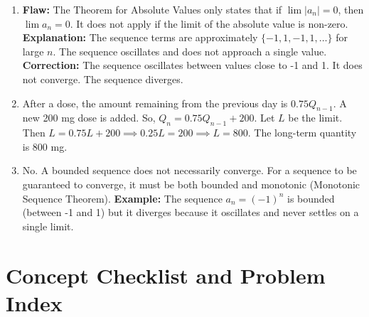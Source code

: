 \documentclass{article}
\begin{document}
\begin{enumerate}
    \item \textbf{Flaw:} The Theorem for Absolute Values only states that if $\lim |a_n| = 0$, then $\lim a_n=0$. It does not apply if the limit of the absolute value is non-zero. \textbf{Explanation:} The sequence terms are approximately $\{-1, 1, -1, 1, \dots\}$ for large $n$. The sequence oscillates and does not approach a single value. \textbf{Correction:} The sequence oscillates between values close to -1 and 1. It does not converge. The sequence diverges.
    \item After a dose, the amount remaining from the previous day is $0.75 Q_{n-1}$. A new 200 mg dose is added. So, $Q_n = 0.75 Q_{n-1} + 200$. Let $L$ be the limit. Then $L = 0.75L + 200 \implies 0.25L = 200 \implies L = 800$. The long-term quantity is 800 mg.
    \item No. A bounded sequence does not necessarily converge. For a sequence to be guaranteed to converge, it must be both bounded and monotonic (Monotonic Sequence Theorem). \textbf{Example:} The sequence $a_n = (-1)^n$ is bounded (between -1 and 1) but it diverges because it oscillates and never settles on a single limit.
\end{enumerate}

\newpage

\section*{Concept Checklist and Problem Index}
\end{document}
